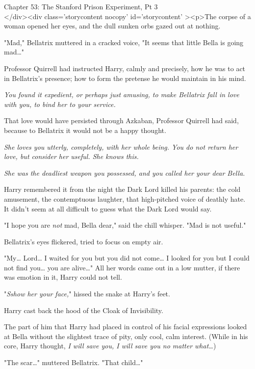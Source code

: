 
Chapter 53: The Stanford Prison Experiment, Pt 3\\
</div><div  class='storycontent nocopy' id='storycontent' ><p>The corpse of a woman opened her eyes, and the dull sunken orbs gazed out at nothing.

"Mad," Bellatrix muttered in a cracked voice, "It seems that little Bella is going mad{\ldots}"

Professor Quirrell had instructed Harry, calmly and precisely, how he was to act in Bellatrix's presence; how to form the pretense he would maintain in his mind.

\emph{You found it expedient, or perhaps just amusing, to make Bellatrix fall in love with you, to bind her to your service.}

That love would have persisted through Azkaban, Professor Quirrell had said, because to Bellatrix it would not be a happy thought.

\emph{She loves you utterly, completely, with her whole being. You do not return her love, but consider her useful. She knows this.}

\emph{She was the deadliest weapon you possessed, and you called her your dear Bella.}

Harry remembered it from the night the Dark Lord killed his parents: the cold amusement, the contemptuous laughter, that high-pitched voice of deathly hate. It didn't seem at all difficult to guess what the Dark Lord would say.

"I hope you are \emph{not} mad, Bella dear," said the chill whisper. "Mad is not useful."

Bellatrix's eyes flickered, tried to focus on empty air.

"My{\ldots} Lord{\ldots} I waited for you but you did not come{\ldots} I looked for you but I could not find you{\ldots} you are alive{\ldots}" All her words came out in a low mutter, if there was emotion in it, Harry could not tell.

"\emph{Sshow her your face,}" hissed the snake at Harry's feet.

Harry cast back the hood of the Cloak of Invisibility.

The part of him that Harry had placed in control of his facial expressions looked at Bella without the slightest trace of pity, only cool, calm interest. (While in his core, Harry thought, \emph{I will save you, I will save you no matter what{\ldots}})

"The scar{\ldots}" muttered Bellatrix. "That child{\ldots}"

